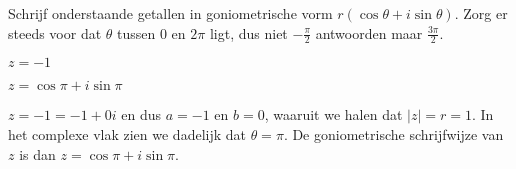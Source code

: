 \documentclass{ximera}
\begin{document}
\begin{exercise}
	\begin{statement}
	Schrijf onderstaande getallen in goniometrische vorm $r(\cos\theta+i\sin \theta)$. Zorg er steeds voor dat $\theta$ tussen 0 en $2\pi$ ligt, dus niet $-\frac{\pi}{2}$ antwoorden maar $\frac{3\pi}{2}$.
	\end{statement}
%				
%				
%				
%				
%				
	
	\begin{question} 
		 $z=-1$ 
		\begin{uitkomst} $z  = \cos \pi + i\sin \pi$
		\end{uitkomst}
		\begin{oplossing} 
			$z=-1 = -1 + 0i$ en dus $a = -1$ en $b = 0$, waaruit we halen dat $|z| = r = 1$. In het complexe vlak zien we dadelijk dat $\theta = \pi$. 
			De goniometrische schrijfwijze van $z$ is dan $z  = \cos \pi + i\sin \pi$.
			\begin{image}[0.5\textwidth]
				\begin{tikzpicture}[scale = 1]
				

\end{tikzpicture}
\end{image}
\end{oplossing}
\end{question}
\end{exercise}
\end{document}
